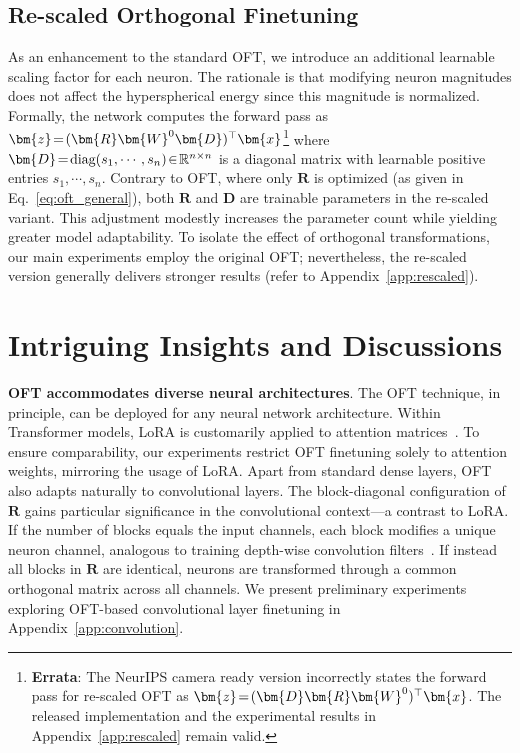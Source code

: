 \subsection{Re-scaled Orthogonal Finetuning}

As an enhancement to the standard OFT, we introduce an additional learnable scaling factor for each neuron. The rationale is that modifying neuron magnitudes does not affect the hyperspherical energy since this magnitude is normalized. Formally, the network computes the forward pass as $\thickmuskip=2mu \medmuskip=2mu\bm{z}=(\bm{R}\bm{W}^0\bm{D})^\top\bm{x}$\footnote{\textbf{Errata}: The NeurIPS camera ready version incorrectly states the forward pass for re-scaled OFT as $\thickmuskip=2mu \medmuskip=2mu\bm{z}=(\bm{D}\bm{R}\bm{W}^0)^\top\bm{x}$. The released implementation and the experimental results in Appendix~\ref{app:rescaled} remain valid.} where $\thickmuskip=2mu \medmuskip=2mu \bm{D}=\text{diag}(s_1,\cdots,s_n)\in\mathbb{R}^{n\times n}$ is a diagonal matrix with learnable positive entries $s_1,\cdots,s_n$. Contrary to OFT, where only $\bm{R}$ is optimized (as given in Eq.~\eqref{eq:oft_general}), both $\bm{R}$ and $\bm{D}$ are trainable parameters in the re-scaled variant. This adjustment modestly increases the parameter count while yielding greater model adaptability. To isolate the effect of orthogonal transformations, our main experiments employ the original OFT; nevertheless, the re-scaled version generally delivers stronger results (refer to Appendix~\ref{app:rescaled}).

\section{Intriguing Insights and Discussions}

\textbf{OFT accommodates diverse neural architectures}. The OFT technique, in principle, can be deployed for any neural network architecture. Within Transformer models, LoRA is customarily applied to attention matrices~\cite{hulora2022}. To ensure comparability, our experiments restrict OFT finetuning solely to attention weights, mirroring the usage of LoRA. Apart from standard dense layers, OFT also adapts naturally to convolutional layers. The block-diagonal configuration of $\bm{R}$ gains particular significance in the convolutional context—a contrast to LoRA. If the number of blocks equals the input channels, each block modifies a unique neuron channel, analogous to training depth-wise convolution filters~\cite{chollet2017xception}. If instead all blocks in $\bm{R}$ are identical, neurons are transformed through a common orthogonal matrix across all channels. We present preliminary experiments exploring OFT-based convolutional layer finetuning in Appendix~\ref{app:convolution}.


